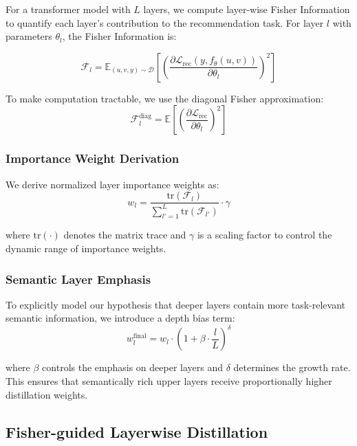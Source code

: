 \documentclass[10pt,conference]{IEEEtran}
\newcommand{\fisher}{\mathcal{F}}
\newcommand{\loss}{\mathcal{L}}
\begin{document}
For a transformer model with $L$ layers, we compute layer-wise Fisher Information to quantify each layer's contribution to the recommendation task. For layer $l$ with parameters $\theta_l$, the Fisher Information is:

\begin{equation}
\fisher_l = \mathbb{E}_{(u,v,y) \sim \mathcal{D}}\left[\left(\frac{\partial \loss_{\text{rec}}(y, f_{\theta}(u,v))}{\partial \theta_l}\right)^2\right]
\end{equation}

To make computation tractable, we use the diagonal Fisher approximation:
\begin{equation}
\fisher_l^{\text{diag}} = \mathbb{E}\left[\left(\frac{\partial \loss_{\text{rec}}}{\partial \theta_l}\right)^2\right]
\end{equation}

\subsubsection{Importance Weight Derivation}

We derive normalized layer importance weights as:
\begin{equation}
w_l = \frac{\text{tr}(\fisher_l)}{\sum_{l'=1}^L \text{tr}(\fisher_{l'})} \cdot \gamma
\end{equation}

where $\text{tr}(\cdot)$ denotes the matrix trace and $\gamma$ is a scaling factor to control the dynamic range of importance weights.

\subsubsection{Semantic Layer Emphasis}

To explicitly model our hypothesis that deeper layers contain more task-relevant semantic information, we introduce a depth bias term:
\begin{equation}
w_l^{\text{final}} = w_l \cdot \left(1 + \beta \cdot \frac{l}{L}\right)^{\delta}
\end{equation}

where $\beta$ controls the emphasis on deeper layers and $\delta$ determines the growth rate. This ensures that semantically rich upper layers receive proportionally higher distillation weights.

\subsection{Fisher-guided Layerwise Distillation}
\end{document}
